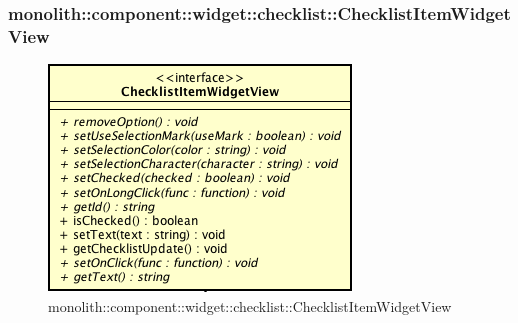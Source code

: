 \subsubsection{monolith::component::widget::checklist::ChecklistItemWidgetView}

\label{monolith::component::widget::checklist::ChecklistItemWidgetView}
\begin{figure}[H]
	\centering
	\includegraphics[scale=0.5]{Sezioni/SottosezioniST/img/ChecklistItemWidgetView.png}
	\caption{monolith::component::widget::checklist::ChecklistItemWidgetView}
\end{figure}

